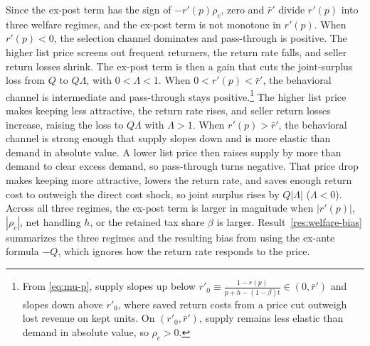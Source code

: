 \documentclass[11pt]{article}
\begin{document}
Since the ex-post term has the sign of $-r'(p)\rho_c$, zero and $\bar{r}'$
divide $r'(p)$ into three welfare regimes, and the ex-post term is not monotone
in $r'(p)$. When $r'(p)<0$, the selection channel dominates and pass-through is
positive. The higher list price screens out frequent returners, the return rate
falls, and seller return losses shrink. The ex-post term is then a gain that
cuts the joint-surplus loss from $Q$ to $Q\Lambda$, with $0<\Lambda<1$. When
$0<r'(p)<\bar{r}'$, the behavioral channel is intermediate and pass-through
stays positive.\footnote{From \eqref{eq:mu-p}, supply slopes up below
$r'_0\equiv\frac{1-r(p)}{p+h-(1-\beta)t}\in(0,\bar{r}')$ and slopes down above
$r'_0$, where saved return costs from a price cut outweigh lost revenue on kept
units. On $(r'_0,\bar{r}')$, supply remains less elastic than demand in
absolute value, so $\rho_c>0$.} The higher list price makes keeping less
attractive, the return rate rises, and seller return losses increase, raising
the loss to $Q\Lambda$ with $\Lambda>1$. When $r'(p)>\bar{r}'$, the behavioral
channel is strong enough that supply slopes down and is more elastic than
demand in absolute value. A lower list price then raises supply by more than
demand to clear excess demand, so pass-through turns negative. That price drop
makes keeping more attractive, lowers the return rate, and saves enough return
cost to outweigh the direct cost shock, so joint surplus rises by $Q|\Lambda|$
($\Lambda<0$). Across all three regimes, the ex-post term is larger in
magnitude when $|r'(p)|$, $|\rho_c|$, net handling $h$, or the retained tax
share $\beta$ is larger. Result~\ref{res:welfare-bias} summarizes the three
regimes and the resulting bias from using the ex-ante formula $-Q$, which
ignores how the return rate responds to the price.
\end{document}
